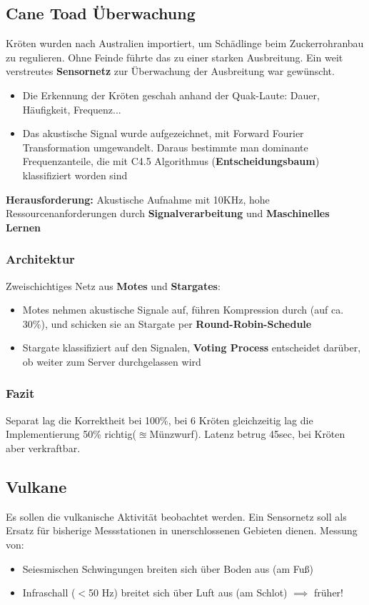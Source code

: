 \documentclass[a4paper]{article}
\begin{document}
\subsection{Cane Toad Überwachung}
Kröten wurden nach Australien importiert, um Schädlinge beim Zuckerrohranbau zu regulieren. Ohne Feinde führte das zu einer starken Ausbreitung. Ein weit verstreutes \textbf{Sensornetz} zur Überwachung der Ausbreitung war gewünscht.
\begin{itemize}
	\item Die Erkennung der Kröten geschah anhand der Quak-Laute: Dauer, Häufigkeit, Frequenz...
	\item Das akustische Signal wurde aufgezeichnet, mit Forward Fourier Transformation umgewandelt. Daraus bestimmte man dominante Frequenzanteile, die mit C4.5 Algorithmus (\textbf{Entscheidungsbaum}) klassifiziert worden sind
\end{itemize}
\textbf{Herausforderung:} Akustische Aufnahme mit 10KHz, hohe Ressourcenanforderungen durch \textbf{Signalverarbeitung } und \textbf{Maschinelles Lernen}
\subsubsection{Architektur}
	Zweischichtiges Netz aus \textbf{Motes} und \textbf{Stargates}:
	\begin{itemize}
		\item Motes nehmen akustische Signale auf, führen Kompression durch (auf ca. 30\%), und schicken sie an Stargate per \textbf{Round-Robin-Schedule}
		\item Stargate klassifiziert auf den Signalen, \textbf{Voting Process} entscheidet darüber, ob weiter zum Server durchgelassen wird 
	\end{itemize}
\subsubsection{Fazit}
Separat lag die Korrektheit bei 100\%, bei 6 Kröten gleichzeitig lag die Implementierung 50\% richtig($\approxeq$Münzwurf). Latenz betrug 45sec, bei Kröten aber verkraftbar.

\subsection{Vulkane}
Es sollen die vulkanische Aktivität beobachtet werden. Ein Sensornetz soll als Ersatz für bisherige Messstationen in unerschlossenen Gebieten dienen. Messung von:
\begin{itemize}
	\item Seiesmischen Schwingungen breiten sich über Boden aus (am Fuß)
	\item Infraschall ($<$50 Hz) breitet sich über Luft aus (am Schlot) $\implies$ früher!
\end{itemize}	
\end{document}
